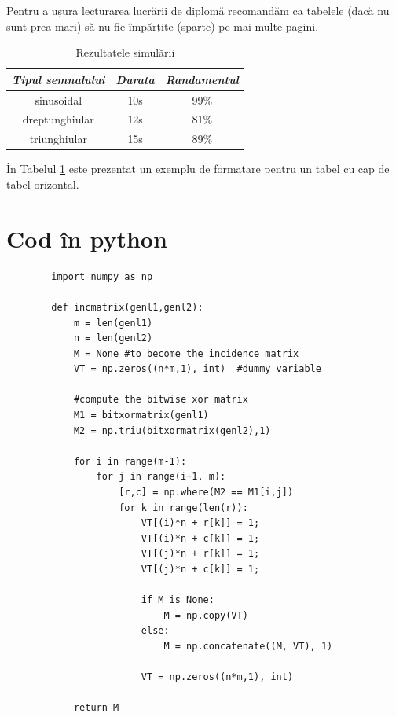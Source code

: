 Pentru a ușura lecturarea lucrării de diplomă recomandăm ca tabelele (dacă nu sunt prea mari) să nu fie împărțite (sparte) pe mai multe pagini.

\begin{table}[ht]
    \centering
    \caption{Rezultatele simulării}
    \begin{tabular}{|c|c|c|} 
        \hline
        \textbf{\textit{Tipul semnalului}} & \textbf{\textit{Durata}} & \textbf{\textit{Randamentul}} \\
        \hline
        sinusoidal & 10s & 99\% \\ 
        \hline
        dreptunghiular & 12s & 81\% \\
        \hline
        triunghiular & 15s & 89\% \\
        \hline
    \end{tabular}
    \label{tabel:2}
\end{table}

În Tabelul \ref{tabel:2} este prezentat un exemplu de formatare pentru un tabel cu cap de tabel orizontal.

\newpage
\section{Cod în python}
\label{anexa6:listing_python}

\begin{code}
    \begin{verbatim}
        import numpy as np
            
        def incmatrix(genl1,genl2):
            m = len(genl1)
            n = len(genl2)
            M = None #to become the incidence matrix
            VT = np.zeros((n*m,1), int)  #dummy variable
            
            #compute the bitwise xor matrix
            M1 = bitxormatrix(genl1)
            M2 = np.triu(bitxormatrix(genl2),1)
        
            for i in range(m-1):
                for j in range(i+1, m):
                    [r,c] = np.where(M2 == M1[i,j])
                    for k in range(len(r)):
                        VT[(i)*n + r[k]] = 1;
                        VT[(i)*n + c[k]] = 1;
                        VT[(j)*n + r[k]] = 1;
                        VT[(j)*n + c[k]] = 1;
                        
                        if M is None:
                            M = np.copy(VT)
                        else:
                            M = np.concatenate((M, VT), 1)
                        
                        VT = np.zeros((n*m,1), int)
            
            return M
    \end{verbatim} 
    \caption{Codul funcției \textit{incmatrix}} 
    \label{code:python_incmatrix}
\end{code}

